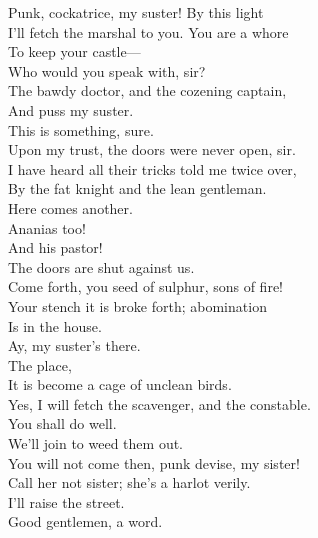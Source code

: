 \documentclass[a4paper,oneside]{memoir}
\begin{document}
\begin{drama*}
Punk, cockatrice, my suster! By this light\\
I'll fetch the marshal to you. You are a whore\\
To keep your castle---\\
\facespeaks {} Who would you speak with, sir?\\
\kastrilspeaks The bawdy doctor, and the cozening captain,\\
And puss my suster.\\
\lovewitspeaks {} This is something, sure.\\
\facespeaks Upon my trust, the doors were never open, sir.\\
\kastrilspeaks I have heard all their tricks told me twice over,\\
By the fat knight and the lean gentleman.\\
\lovewitspeaks Here comes another.\\
\facespeaks {} Ananias too!\\
And his pastor!\\
\tribulationspeaks {} The doors are shut against us.\\
\ananiasspeaks {} Come forth, you seed of sulphur, sons of fire!\\
Your stench it is broke forth; abomination\\
Is in the house.\\
\kastrilspeaks {} Ay, my suster's there.\\
\ananiasspeaks {} The place,\\
It is become a cage of unclean birds.\\
\kastrilspeaks Yes, I will fetch the scavenger, and the constable.\\
\tribulationspeaks You shall do well.\\
\ananiasspeaks {} We'll join to weed them out.\\
\kastrilspeaks You will not come then, punk devise, my sister!\\
\ananiasspeaks Call her not sister; she's a harlot verily.\\
\kastrilspeaks I'll raise the street.\\
\lovewitspeaks {} Good gentlemen, a word.\\

\end{drama*}
\end{document}
